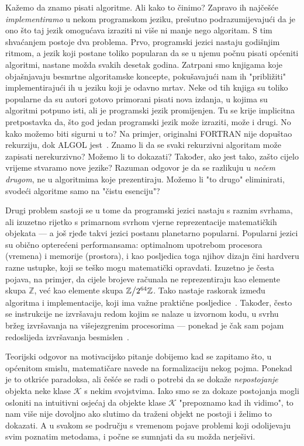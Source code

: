 Kažemo da znamo pisati algoritme. Ali kako to činimo? Zapravo ih najčešće \emph{implementiramo} u nekom programskom jeziku, prešutno podrazumijevajući da je ono što taj jezik omogućava izraziti ni više ni manje nego algoritam. S tim shvaćanjem postoje dva problema. Prvo, programski jezici nastaju godišnjim ritmom, a jezik koji postane toliko popularan da se u njemu počnu pisati općeniti algoritmi, nastane možda svakih desetak godina. Zatrpani smo knjigama koje objašnjavaju besmrtne algoritamske koncepte, pokušavajući nam ih "približiti" implementirajući ih u jeziku koji je odavno mrtav. Neke od tih knjiga su toliko popularne da su autori gotovo primorani pisati nova izdanja, u kojima su algoritmi potpuno isti, ali je programski jezik promijenjen. Tu se krije implicitna pretpostavka da, što god jedan programski jezik može izraziti, može i drugi. No kako možemo biti sigurni u to? Na primjer, originalni FORTRAN nije dopuštao rekurziju, dok ALGOL jest~\cite{url:recursionAlgol}. Znamo li da se svaki rekurzivni algoritam može zapisati nerekurzivno? Možemo li to dokazati? Također, ako jest tako, zašto cijelo vrijeme stvaramo nove jezike? Razuman odgovor je da se razlikuju u \emph{nečem drugom}, ne u algoritmima koje prezentiraju. Možemo li "to drugo" eliminirati, svodeći algoritme samo na "čistu esenciju"?

Drugi problem sastoji se u tome da programski jezici nastaju s raznim svrhama, ali izuzetno rijetko s primarnom svrhom vjerne reprezentacije matematičkih objekata --- a još rjeđe takvi jezici postanu planetarno popularni. Popularni jezici su obično opterećeni performansama: optimalnom upotrebom procesora (vremena) i memorije (prostora), i kao posljedica toga njihov dizajn čini hardveru razne ustupke, koji se teško mogu matematički opravdati. Izuzetno je česta pojava, na primjer, da cijele brojeve računala ne reprezentiraju kao elemente skupa $\mathbb Z$, već kao elemente skupa $\mathbb Z\big\slash2^{64}\mathbb Z$. Tako nastaje raskorak između algoritma i implementacije, koji ima važne praktične posljedice~\cite{url:wrongBinsearch}. Također, često se instrukcije ne izvršavaju redom kojim se nalaze u izvornom kodu, u svrhu bržeg izvršavanja na višejezgrenim procesorima --- ponekad je čak sam pojam redoslijeda izvršavanja besmislen~\cite[str.\ 10]{art:memorymodels}.

Teorijski odgovor na motivacijsko pitanje dobijemo kad se zapitamo što, u općenitom smislu, matematičare navede na formalizaciju nekog pojma. Ponekad je to otkriće paradoksa, ali češće se radi o potrebi da se dokaže \emph{nepostojanje} objekta neke klase $\mathcal K$ s nekim svojstvima. Iako smo se za dokaze postojanja mogli osloniti na intuitivni osjećaj da objekte klase $\mathcal K$ "prepoznamo kad ih vidimo", to nam više nije dovoljno ako slutimo da traženi objekt ne postoji i želimo to dokazati. A u svakom se području s vremenom pojave problemi koji odolijevaju svim poznatim metodama, i počne se sumnjati da su možda nerješivi.

